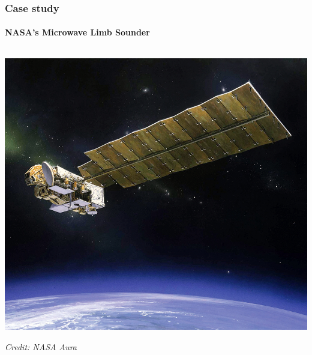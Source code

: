 \documentclass{snedecorbeamer}
\begin{document}
\begin{frame}
  \frametitle{Case study}
  \framesubtitle{NASA's Microwave Limb Sounder}

    \begin{columns}[t]
    \begin{column}{0.5\textwidth}
      \begin{center}
	\includegraphics[height=.4\textheight]{aura.jpg}

	{\footnotesize \textit{Credit: NASA Aura}}

	\vspace{5ex}


\end{center}
\end{column}
\end{columns}
\end{frame}
\end{document}
